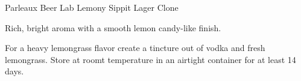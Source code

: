 \begin{recipe}{Parleaux Beer Lab Lemony Sippit Lager Clone}

\begin{aboutblock}
Rich, bright aroma with a smooth lemon candy-like finish. \sourceaha
\end{aboutblock}


\begin{methodandtiming}
  
\begin{mashsteps}
\end{mashsteps}

\begin{fermentationsteps}
\end{fermentationsteps}

\begin{directions}
For a heavy lemongrass flavor create a tincture out of  vodka
and  fresh lemongrass. Store at roomt temperature in an
airtight container for at least 14 days.
\end{directions}

\end{methodandtiming}

\recipebreak

\begin{ingredientsblock}

\begin{malts}
\end{malts}

\begin{hops}
\end{hops}


\end{ingredientsblock}

\end{recipe}

